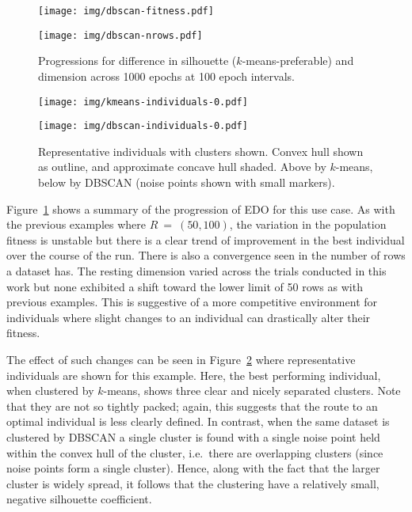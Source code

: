 \begin{figure}[htbp]
    \centering
    \begin{minipage}{\imgwidth}
        \centering
        \texttt{[image: img/dbscan-fitness.pdf]}
    \end{minipage}

    \begin{minipage}{\imgwidth}
        \centering
        \texttt{[image: img/dbscan-nrows.pdf]}
    \end{minipage}
    \caption{Progressions for difference in silhouette (\(k\)-means-preferable)
             and dimension across 1000 epochs at 100 epoch
             intervals.}\label{figure:dbscan-silhouette}
\end{figure}

\begin{figure}[htbp]
    \centering
    \texttt{[image: img/kmeans-individuals-0.pdf]}

    \texttt{[image: img/dbscan-individuals-0.pdf]}
    \caption{Representative individuals with clusters shown. Convex hull shown
             as outline, and approximate concave hull shaded. Above by
             \(k\)-means, below by DBSCAN (noise points shown with small
             markers).}\label{figure:dbscan-individuals}
\end{figure}

Figure~\ref{figure:dbscan-silhouette} shows a summary of the progression of EDO
for this use case. As with the previous examples where \(R~=~(50, 100)\), the
variation in the population fitness is unstable but there is a clear trend of
improvement in the best individual over the course of the run. There is also a
convergence seen in the number of rows a dataset has. The resting dimension
varied across the trials conducted in this work but none exhibited a shift
toward the lower limit of 50 rows as with previous examples. This is suggestive
of a more competitive environment for individuals where slight changes to an
individual can drastically alter their fitness.

The effect of such changes can be seen in Figure~\ref{figure:dbscan-individuals}
where representative individuals are shown for this example. Here, the best
performing individual, when clustered by \(k\)-means, shows three clear and
nicely separated clusters. Note that they are not so tightly packed; again, this
suggests that the route to an optimal individual is less clearly defined. In
contrast, when the same dataset is clustered by DBSCAN a single cluster is found
with a single noise point held within the convex hull of the cluster, i.e.\
there are overlapping clusters (since noise points form a single cluster).
Hence, along with the fact that the larger cluster is widely spread, it follows
that the clustering have a relatively small, negative silhouette coefficient.

